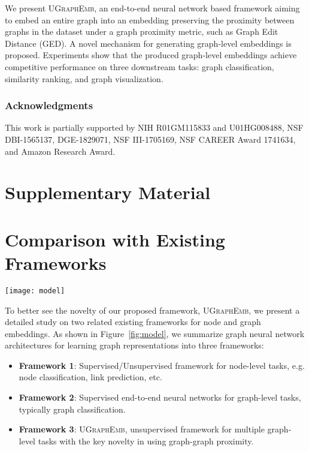\documentclass{article}
\newcommand{\model}{\textsc{UGraphEmb}\xspace}
\begin{document}
We present \model, an end-to-end neural network based framework aiming to embed an entire graph into an embedding preserving the proximity between graphs in the dataset under a graph proximity metric, such as Graph Edit Distance (GED). A novel mechanism for generating graph-level embeddings is proposed. Experiments show that the produced graph-level embeddings achieve competitive performance on three downstream tasks: graph classification, similarity ranking, and graph visualization. 



\label{sec-conc} 
\subsubsection*{Acknowledgments}

This work is partially supported by NIH R01GM115833 and U01HG008488, NSF DBI-1565137, DGE-1829071, NSF III-1705169, NSF CAREER Award 1741634, and Amazon Research Award.


\clearpage
\small



\setcounter{section}{0} \clearpage
\newpage
\section*{{\Large Supplementary Material}}

\def\thesection{\Alph{section}}

\section{Comparison with Existing Frameworks}

\begin{figure*}
\centering
\texttt{[image: model]}
\caption{Architecture 1 and 2 are typical neural network architectures for graph representation learning. Architecture 3 is our proposed \model.}
\label{fig:model}
\vspace*{-2mm}
\end{figure*}

To better see the novelty of our proposed framework, \model, we present a detailed study on two related existing frameworks for node and graph embeddings. As shown in Figure~\ref{fig:model}, we summarize graph neural network architectures for learning graph representations into three frameworks:
\begin{itemize}
    \item \textbf{{Framework 1}}: Supervised/Unsupervised framework for node-level tasks, e.g. node classification, link prediction, etc.
    \item \textbf{{Framework 2}}: Supervised end-to-end neural networks for graph-level tasks, typically graph classification.
    \item \textbf{{Framework 3}}: \model, unsupervised framework for multiple graph-level tasks with the key novelty in using graph-graph proximity.
\end{itemize}
\end{document}
